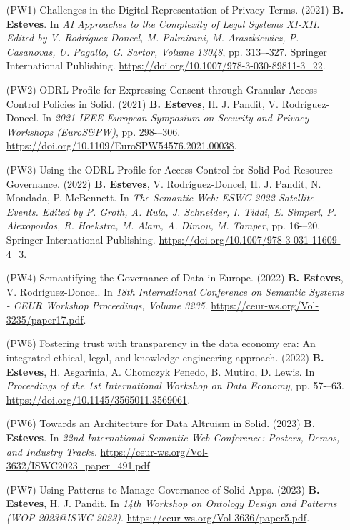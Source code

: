 \begin{enumerate}
    \item [(PW1)] Challenges in the Digital Representation of Privacy Terms. (2021) \textbf{B. Esteves}. In \textit{AI Approaches to the Complexity of Legal Systems XI-XII. Edited by V. Rodríguez-Doncel, M. Palmirani, M. Araszkiewicz, P. Casanovas, U. Pagallo, G. Sartor, Volume 13048}, pp. 313–-327. Springer International Publishing. \url{https://doi.org/10.1007/978-3-030-89811-3\_22}.
    \item [(PW2)] ODRL Profile for Expressing Consent through Granular Access Control Policies in Solid. (2021) \textbf{B. Esteves}, H. J. Pandit, V. Rodríguez-Doncel. In \textit{2021 IEEE European Symposium on Security and Privacy Workshops (EuroS\&PW)}, pp. 298-–306. \url{https://doi.org/10.1109/EuroSPW54576.2021.00038}.
    \item [(PW3)] Using the ODRL Profile for Access Control for Solid Pod Resource Governance. (2022) \textbf{B. Esteves}, V. Rodríguez-Doncel, H. J. Pandit, N. Mondada, P. McBennett. In \textit{The Semantic Web: ESWC 2022 Satellite Events. Edited by P. Groth, A. Rula, J. Schneider, I. Tiddi, E. Simperl, P. Alexopoulos, R. Hoekstra, M. Alam, A. Dimou, M. Tamper}, pp. 16-–20. Springer International Publishing. \url{https://doi.org/10.1007/978-3-031-11609-4\_3}.
    \item [(PW4)] Semantifying the Governance of Data in Europe. (2022) \textbf{B. Esteves}, V. Rodríguez-Doncel. In \textit{18th International Conference on Semantic Systems - CEUR Workshop Proceedings, Volume 3235}. \url{https://ceur-ws.org/Vol-3235/paper17.pdf}.
    \item [(PW5)] Fostering trust with transparency in the data economy era: An integrated ethical, legal, and knowledge engineering approach. (2022) \textbf{B. Esteves}, H. Asgarinia, A. Chomczyk Penedo, B. Mutiro, D. Lewis. In \textit{Proceedings of the 1st International Workshop on Data Economy}, pp. 57-–63. \url{https://doi.org/10.1145/3565011.3569061}.
    \item [(PW6)] Towards an Architecture for Data Altruism in Solid. (2023) \textbf{B. Esteves}. In \textit{22nd International Semantic Web Conference: Posters, Demos, and Industry Tracks}. \url{https://ceur-ws.org/Vol-3632/ISWC2023_paper_491.pdf}
    \item [(PW7)] Using Patterns to Manage Governance of Solid Apps. (2023) \textbf{B. Esteves}, H. J. Pandit. In \textit{14th Workshop on Ontology Design and Patterns (WOP 2023@ISWC 2023)}. \url{https://ceur-ws.org/Vol-3636/paper5.pdf}.
\end{enumerate}

